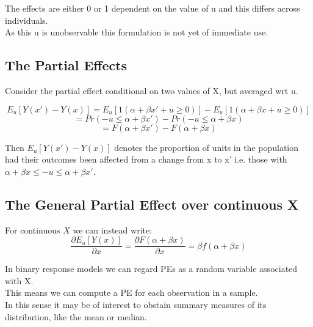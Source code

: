 \documentclass[DIV=14,titlepage=false]{scrreprt}
\begin{document}
The effects are either 0 or 1 dependent on the value of u and this differs across individuals.\\
As this u is unobservable this formulation is not yet of immediate use.

\subsection{The Partial Effects}
Consider the partial effect conditional on two values of X, but averaged wrt u.

\[E_u[Y(x')-Y(x)]=E_u[1(\alpha+\beta x' + u \geq 0)]-E_u[1(\alpha+\beta x + u \geq 0)]\]
\[=Pr(-u \leq \alpha+\beta x')-Pr(-u \leq \alpha+\beta x)\]
\[=F(\alpha+\beta x')-F(\alpha+\beta x)\]

Then \(E_u[Y(x')-Y(x)]\) denotes the proportion of units in the population had their outcomes been affected from a change from x to x'
i.e. those with \(\alpha+\beta x \leq -u \leq \alpha+\beta x'\).

\subsection{The General Partial Effect over continuous X}

For continuous \(X\) we can instead write:
\[\frac{\partial E_u[Y(x)]}{\partial x}=\frac{\partial F(\alpha+\beta x)}{\partial x}=\beta f(\alpha+\beta x)\]

In binary response models we can regard PEs as a random variable associated with X.\\
This means we can compute a PE for each observation in a sample.\\
In this sense it may be of interest to obstain summary measures of its distribution, like the mean or median.
\end{document}
